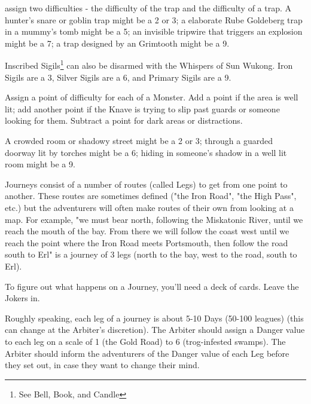 {\begin{multicols}{2}
        assign two difficulties - the difficulty of  the trap and the difficulty of  a trap.  A hunter's snare or goblin trap might be a 2 or 3; a elaborate Rube Goldeberg trap in a mummy's tomb might be a 5; an invisible tripwire that triggers an explosion might be a 7; a trap designed by an Grimtooth might be a 9.

      Inscribed Sigils\footnote{See Bell, Book, and Candle} can also be disarmed with the Whispers of Sun Wukong. Iron Sigils are a 3, Silver Sigils are a 6, and Primary Sigils are a 9.


  
     Assign a point of difficulty for each \HD of a Monster.  Add a point if the area is well lit; add another point if the Knave is trying to slip past guards or someone looking for them.  Subtract a point for dark areas or distractions.

    A crowded room or shadowy street might be a 2 or 3; through a guarded doorway lit by torches might be a 6; hiding in someone's shadow in a well lit room might be a 9.




Journeys consist of a number of routes (called Legs) to get from one point to another.  These routes are sometimes defined ("the Iron Road", "the High Pass", etc.) but the adventurers will often make routes of their own from looking at a map.  For example, "we must bear north, following the Miskatonic River, until we reach the mouth of the bay.  From there we will follow the coast west until we reach the point where the Iron Road meets Portsmouth, then follow the road south to Erl" is a journey of 3 legs (north to the bay, west to the road, south to Erl).

To figure out what happens on a Journey, you'll need a deck of cards.  Leave the Jokers in.

Roughly speaking, each leg of a journey is about 5-10 Days (50-100 leagues) (this can change at the Arbiter's discretion).  The Arbiter should assign a Danger value to each leg on a scale of 1 (the Gold Road) to 6 (trog-infested swamps).  The Arbiter should inform the adventurers of the Danger value of each Leg before they set out, in case they want to change their mind.


\end{multicols}}
